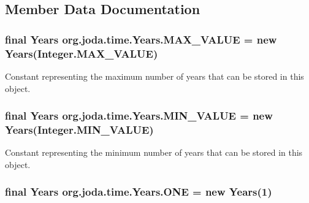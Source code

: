 \subsection{Member Data Documentation}
\hypertarget{classorg_1_1joda_1_1time_1_1_years_a88ee97f1c5b2a4a3a820790d5aaa36c7}{
\subsubsection[{M\-A\-X\-\_\-\-V\-A\-L\-U\-E}]{\setlength{\rightskip}{0pt plus 5cm}final {\bf Years} org.\-joda.\-time.\-Years.\-M\-A\-X\-\_\-\-V\-A\-L\-U\-E = new {\bf Years}(Integer.\-M\-A\-X\-\_\-\-V\-A\-L\-U\-E)\hspace{0.3cm}{\ttfamily [static]}}}\label{classorg_1_1joda_1_1time_1_1_years_a88ee97f1c5b2a4a3a820790d5aaa36c7}
Constant representing the maximum number of years that can be stored in this object. \hypertarget{classorg_1_1joda_1_1time_1_1_years_a2f47aa3279ff248e2b500ae7ce1b749c}{
\subsubsection[{M\-I\-N\-\_\-\-V\-A\-L\-U\-E}]{\setlength{\rightskip}{0pt plus 5cm}final {\bf Years} org.\-joda.\-time.\-Years.\-M\-I\-N\-\_\-\-V\-A\-L\-U\-E = new {\bf Years}(Integer.\-M\-I\-N\-\_\-\-V\-A\-L\-U\-E)\hspace{0.3cm}{\ttfamily [static]}}}\label{classorg_1_1joda_1_1time_1_1_years_a2f47aa3279ff248e2b500ae7ce1b749c}
Constant representing the minimum number of years that can be stored in this object. \hypertarget{classorg_1_1joda_1_1time_1_1_years_aae84b40a788d4eda172c64e6444183d5}{
\subsubsection[{O\-N\-E}]{\setlength{\rightskip}{0pt plus 5cm}final {\bf Years} org.\-joda.\-time.\-Years.\-O\-N\-E = new {\bf Years}(1)\hspace{0.3cm}{\ttfamily [static]}}}\label{classorg_1_1joda_1_1time_1_1_years_aae84b40a788d4eda172c64e6444183d5}
